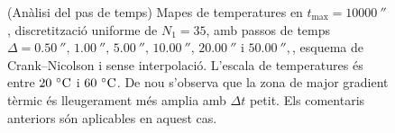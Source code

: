 \begin{figure}[ht]
\begin{subfigure}{.5\textwidth}
		\label{Temps fig:pas_temps_18}
	\end{subfigure}
	\caption{(Anàlisi del pas de temps) Mapes de temperatures en $t_\text{max} = 10000 \ \second$, discretització uniforme de $N_1 = 35$, amb passos de temps $\Delta = 0.50 \ \second, \, 1.00 \ \second, \, 5.00 \ \second, \, 10.00 \ \second, \, 20.00 \ \second$ i $50.00 \ \second,$, esquema de Crank--Nicolson i sense interpolació. L'escala de temperatures és entre $20 \ \celsius$ i $60 \ \celsius$. De nou s'observa que la zona de major gradient tèrmic és lleugerament més amplia amb $\Delta t$ petit. Els comentaris anteriors són aplicables en aquest cas.}	
	\label{fig:pas_temps_10000}
\end{figure} 


